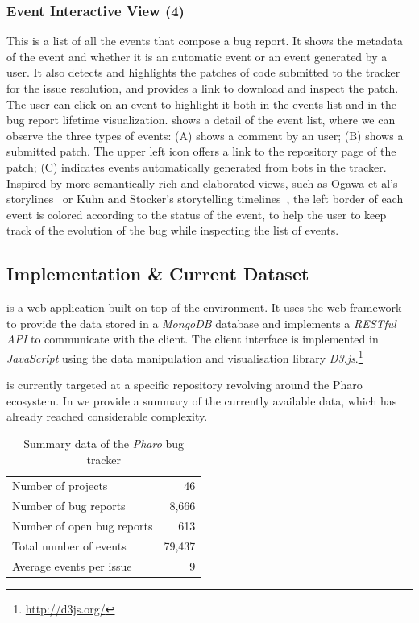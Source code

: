 \subsubsection{Event Interactive View (4)}
This is a list of all the events that compose a bug report.
It shows the metadata of the event and whether it is an automatic event or an event generated by a user.
It also detects and highlights the patches of code submitted to the tracker for the issue resolution, and provides a link to download and inspect the patch.
The user can click on an event to highlight it both in the events list and in the bug report lifetime visualization.
 shows a detail of the event list, where we can observe the three types of events: (A) shows a comment by an user; (B) shows a submitted patch.
The upper left icon offers a link to the repository page of the patch; (C) indicates events automatically generated from bots in the tracker.
Inspired by more semantically rich and elaborated views, such as Ogawa et al's storylines~\cite{Ogaw2010a} or Kuhn and Stocker's storytelling timelines~\cite{Kuhn2012a}, the left border of each event is colored according to the status of the event, to help the user to keep track of the evolution of the bug while inspecting the list of events.

\subsection{Implementation \& Current Dataset}

\ib is a web application built on top of the \pha environment.
It uses the \sea web framework~\cite{Duca2010a} to provide the data stored in a \textit{MongoDB} database and implements a \textit{RESTful API} to communicate with the client.
The client interface is implemented in \textit{JavaScript} using the data manipulation and visualisation library \textit{D3.js}.\footnote{\url{http://d3js.org/}}

\ib is currently targeted at a specific \fbz repository revolving around the Pharo ecosystem.
In  we provide a summary of the currently available data, which has already reached considerable complexity.

\begin{table}[ht]
\center
\caption{Summary data of the \textit{Pharo} bug tracker}
\label{tab-tracker-summary}
\begin{tabular}{p{7cm} r} \hline
Number of projects & 46 \\
Number of bug reports & 8,666 \\
Number of open bug reports & 613 \\
Total number of events & 79,437 \\
Average events per issue & 9 \\ \hline
\end{tabular}
\end{table}

